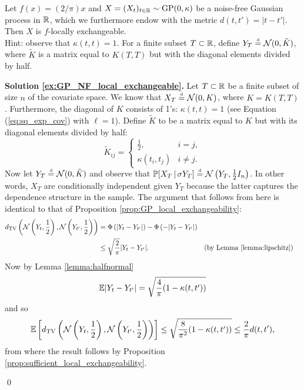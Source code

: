 \vskip 0.75cm


\begin{exercise} \label{ex:GP_NF_local_exchangeable}
	Let $f(x) = (2/\pi) x$ and $X = (X_t)_{t \in \mathbb{R}} \sim \mathrm{GP} (0, \kappa)$ be a noise-free Gaussian process in $\mathbb{R}$, which we furthermore endow with the metric  $d(t, t') = |t-t'|$. Then $X$ is $f$-locally exchangeable. \\
	
	Hint: observe that $\kappa(t, t) = 1$.	For a finite subset $T \subset \mathbb{R}$, define $Y_T \stackrel{\text{\rm\tiny d}}{=} \mathcal{N} ( 0, \tilde{K} )$, where $\tilde{K}$ is a matrix equal to $K(T, T)$ but with the diagonal elements divided by half.
\end{exercise}


\textbf{Solution \ref{ex:GP_NF_local_exchangeable}. \hspace{0.05cm}} Let $T \subset \mathbb{R}$ be a finite subset of size $n$ of the covariate space. We know that $X_T \stackrel{\text{\rm\tiny d}}{=} \mathcal{N} (0, K)$, where $K = K(T,T)$. Furthermore, the diagonal of $K$ consists of 1's: $\kappa(t, t) = 1$ (see Equation (\ref{eq:sq_exp_cov}) with $\ell = 1$). Define $\tilde{K}$ to be a matrix equal to $K$ but with its diagonal elements divided by half:
\begin{equation*}
	\tilde{K}_{ij} = \begin{cases}
					  	\frac{1}{2}, & i=j, \\
					  	\kappa(t_i, t_j) & i \neq j.
					  \end{cases}
\end{equation*}
Now let $Y_T \stackrel{\text{\rm\tiny d}}{=} \mathcal{N}(0, \tilde{K})$ and observe that $\mathbb{P} [ X_T \, | \, \sigma Y_T ] \stackrel{\text{\rm\tiny d}}{=} \mathcal{N} \left( Y_T, \frac{1}{2} I_n \right)$. In other words, $X_T$ are conditionally independent given $Y_T$ because the latter captures the dependence structure in the sample. The argument that follows from here is identical to that of Proposition \ref{prop:GP_local_exchangeability}:
\begin{align*}
	d_{\mathrm{TV}} \left( \mathcal{N} \left( Y_t, \frac{1}{2} \right) , \mathcal{N} \left( Y_{t'}, \frac{1}{2} \right) \right) &= \Phi \left( |Y_t - Y_{t'} | \right) - \Phi \left( -|Y_t - Y_{t'} | \right) \\
		&\leq \sqrt{\frac{2}{\pi}} |Y_t - Y_{t'}|. && \text{(by Lemma \ref{lemma:lipschitz})}
\end{align*}
Now by Lemma \ref{lemma:halfnormal}
\begin{equation*}
	\mathbb{E} | Y_t - Y_{t'} | = \sqrt{\frac{4}{\pi}(1 - \kappa(t, t'))}
\end{equation*}
and so
\begin{equation*}
	\mathbb{E} \left[ d_{\mathrm{TV}} \left( \mathcal{N} \left( Y_t, \frac{1}{2} \right) , \mathcal{N} \left( Y_{t'}, \frac{1}{2} \right) \right) \right] \leq \sqrt{\frac{8}{\pi^2}(1 - \kappa(t, t'))} \leq \frac{2}{\pi} d(t, t'),
\end{equation*}
from where the result follows by Proposition \ref{prop:sufficient_local_exchangeability}.

\qed 

